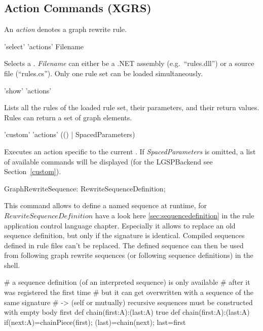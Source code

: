 \subsection{Action Commands (XGRS)}
\label{grsthings}
An \emph{action} denotes a graph rewrite rule.

\begin{rail}
  'select' 'actions' Filename
\end{rail}
Selects a .
\emph{Filename} can either be a .NET assembly (e.g.\ ``rules.dll'') or a source file (``rules.cs'').
Only one rule set can be loaded simultaneously.

\begin{rail}
  'show' 'actions'
\end{rail}
Lists all the rules of the loaded rule set, their parameters, and their return values.
Rules can return a set of graph elements.

\begin{rail}
  'custom' 'actions' (() | SpacedParameters)
\end{rail}
Executes an action specific to the current .
If \emph{SpacedParameters} is omitted, a list of available commands will be displayed (for the LGSPBackend see Section~\ref{custom}).

\begin{rail}
  GraphRewriteSequence: RewriteSequenceDefinition;
\end{rail}
This command allows to define a named sequence at runtime, for $RewriteSequenceDefinition$ have a look here  \ref{sec:sequencedefinition} in the rule application control language chapter.
Especially it allows to replace an old sequence definition, but only if the signature is identical.
Compiled sequences defined in rule files can't be replaced.
The defined sequence can then be used from following graph rewrite sequences (or following sequence definitions) in the shell.

\begin{example}
\begin{grgen}
# a sequence definition (of an interpreted sequence) is only available
# after it was registered the first time
# but it can get overwritten with a sequence of the same signature
# -> (self or mutually) recursive sequences must be constructed with empty body first
def chain(first:A):(last:A){ true }
def chain(first:A):(last:A){ if{(next:A)=chainPiece(first); (last)=chain(next); last=first} }
\end{grgen}
\end{example}

